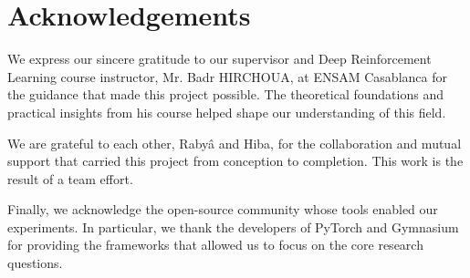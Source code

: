 \chapter*{\center \Large Acknowledgements}

We express our sincere gratitude to our supervisor and Deep Reinforcement Learning course instructor, Mr. Badr HIRCHOUA, at ENSAM Casablanca for the guidance that made this project possible. The theoretical foundations and practical insights from his course helped shape our understanding of this field.

We are grateful to each other, Rabyâ and Hiba, for the collaboration and mutual support that carried this project from conception to completion. This work is the result of a team effort.

Finally, we acknowledge the open-source community whose tools enabled our experiments. In particular, we thank the developers of PyTorch and Gymnasium for providing the frameworks that allowed us to focus on the core research questions.
